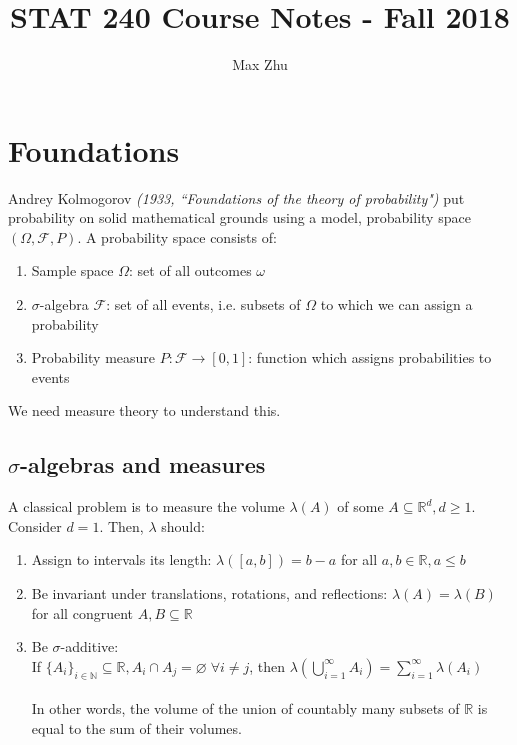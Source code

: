 \documentclass{article}
\title{STAT 240 Course Notes - Fall 2018}
\author{Max Zhu}
\begin{document}
	\maketitle
	\tableofcontents\newpage
	
	\section{Foundations}
	Andrey Kolmogorov \textit{(1933, ``Foundations of the theory of probability")} put probability on solid mathematical grounds using a model, probability space $(\Omega, \mathcal{F}, P)$. A probability space consists of:
	\begin{enumerate}
		\item Sample space $\Omega$: set of all outcomes $\omega$
		\item $\sigma$-algebra $\mathcal{F}$: set of all events, i.e. subsets of $\Omega$ to which we can assign a probability
		\item Probability measure $P: \mathcal{F} \rightarrow  [0, 1]$: function which assigns probabilities to events
	\end{enumerate}
	
	We need measure theory to understand this.
	
	\subsection{$\sigma$-algebras and measures}
	A classical problem is to measure the volume $\lambda(A)$ of some $A\subseteq \mathbb{R}^d, d\geq 1$. Consider $d=1$. Then, $\lambda$ should:
	\begin{enumerate}[label=(\roman*)]
		\item Assign to intervals its length: $\lambda([a, b])=b-a$ for all $a, b\in \mathbb{R}, a \leq b$
		\item Be invariant under translations, rotations, and reflections: $\lambda(A)=\lambda(B)$ for all congruent $A, B\subseteq \mathbb{R}$
		\item Be $\sigma$-additive:\\
		If $\{A_i\}_{i\in\mathbb{N}}\subseteq\mathbb{R}, A_i\cap A_j=\varnothing\;\forall i\neq j$, then $\lambda(\bigcup_{i=1}^{\infty}A_i)=\sum_{i=1}^{\infty}\lambda(A_i)$\\\\
		In other words, the volume of the union of countably many subsets of $\mathbb{R}$ is equal to the sum of their volumes.
	\end{enumerate}
	
\end{document}
